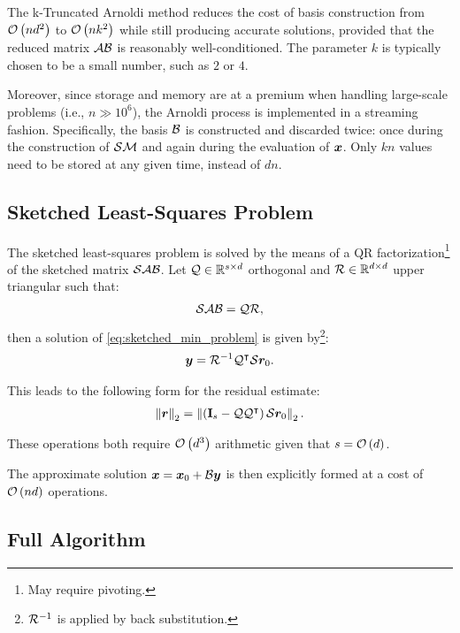The k-Truncated Arnoldi method reduces the cost of basis construction from $\mathcal{O} \left( n d^2 \right)$ to $\mathcal{O} \left( n k^2 \right)$ while still producing accurate solutions, provided that the reduced matrix $\mathcal{A} \mathcal{B}$ is reasonably well-conditioned. The parameter $k$ is typically chosen to be a small number, such as $2$ or $4$.

Moreover, since storage and memory are at a premium when handling large-scale problems (i.e., $n \gg 10^6$), the Arnoldi process is implemented in a streaming fashion. Specifically, the basis $\mathcal{B}$ is constructed and discarded twice: once during the construction of $\mathcal{S} \mathcal{M}$ and again during the evaluation of $\bm{x}$. Only $k n$ values need to be stored at any given time, instead of $dn$.

\newpage
\subsection{Sketched Least-Squares Problem} \label{sseq:least_squares}

The sketched least-squares problem is solved by the means of a QR factorization\footnote{May require pivoting.} of the sketched matrix $\mathcal{S} \mathcal{A} \mathcal{B}$. Let $\mathcal{Q} \in \mathbb{R}^{s \times d}$ orthogonal and $\mathcal{R} \in \mathbb{R}^{d \times d}$ upper triangular such that:
\begin{align}
    \mathcal{S} \mathcal{A} \mathcal{B} = \mathcal{Q} \mathcal{R},
\end{align}
then a solution of \cref{eq:sketched_min_problem} is given by\footnote{$\mathcal{R}^{-1}$ is applied by back substitution.}:
\begin{align}
    \bm{y} = \mathcal{R}^{-1} \mathcal{Q}^{\intercal} \mathcal{S} \bm{r}_0.
\end{align}

This leads to the following form for the residual estimate:
\begin{align}
    \left\lVert \bm{r} \right\rVert_2 = \left\lVert  \left( \mathbf{I}_s - \mathcal{Q} \mathcal{Q}^{\intercal} \right) \mathcal{S} \bm{r}_0  \right\rVert_2.
\end{align}

These operations both require $\mathcal{O} \left( d^3 \right)$ arithmetic given that $s = \mathcal{O} \left( d \right)$.

The approximate solution $\bm{x} = \bm{x}_0 + \mathcal{B} \bm{y}$ is then explicitly formed at a cost of $\mathcal{O} \left( n d \right)$ operations.

\subsection{Full Algorithm} \label{sseq:algorithm}

